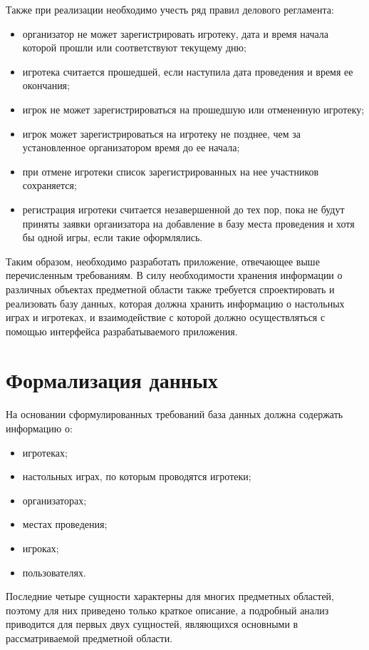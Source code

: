 Также при реализации необходимо учесть ряд правил делового регламента:
\begin{itemize}
    \item организатор не может зарегистрировать игротеку, дата и время начала
        которой прошли или соответствуют текущему дню;
    \item игротека считается прошедшей, если наступила дата проведения и время
        ее окончания;
    \item игрок не может зарегистрироваться на прошедшую или отмененную
        игротеку;
    \item игрок может зарегистрироваться на игротеку не позднее, чем за
        установленное организатором время до ее начала;
    \item при отмене игротеки список зарегистрированных на нее участников
        сохраняется;
    \item регистрация игротеки считается незавершенной до тех пор, пока не будут
        приняты заявки организатора на добавление в базу места проведения и хотя
        бы одной игры, если такие оформлялись.
\end{itemize}

Таким образом, необходимо разработать приложение, отвечающее выше перечисленным
требованиям. В силу необходимости хранения информации о различных объектах
предметной области также требуется спроектировать и реализовать базу данных,
которая должна хранить информацию о настольных играх и игротеках, и
взаимодействие с которой должно осуществляться с помощью интерфейса
разрабатываемого приложения.

\section{\label{head:01}Формализация данных}

На основании сформулированных требований база данных должна содержать информацию
о:

\begin{itemize}
    \item игротеках;
    \item настольных играх, по которым проводятся игротеки;
    \item организаторах;
    \item местах проведения;
    \item игроках;
    \item пользователях.
\end{itemize}

Последние четыре сущности характерны для многих предметных областей, поэтому для
них приведено только краткое описание, а подробный анализ приводится для первых
двух сущностей, являющихся основными в рассматриваемой предметной области.

